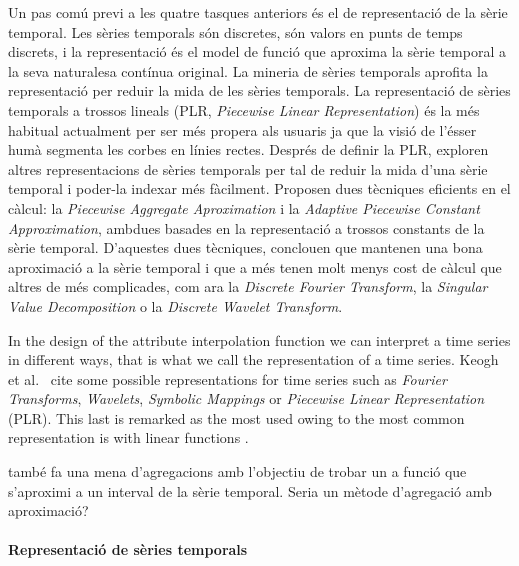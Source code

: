 Un pas comú previ a les quatre tasques anteriors és el de representació de la sèrie temporal. Les sèries temporals són discretes, són valors en punts de temps discrets, i la representació és el model de funció que aproxima la sèrie temporal a la seva naturalesa contínua original. La mineria de sèries temporals aprofita la representació per reduir la mida de les sèries temporals.
La representació de sèries temporals a trossos lineals (PLR, \emph{Piecewise Linear Representation}) \parencite{keogh97,keogh98} {é}s la més habitual actualment per ser més propera als usuaris ja que la visió de l'ésser humà segmenta les corbes en línies rectes.
Després de definir la PLR, \textcite{keogh00,keogh01} exploren altres representacions de sèries temporals per tal de reduir la mida d'una sèrie temporal i poder-la indexar més fàcilment. Proposen dues tècniques eficients en el càlcul: la \emph{Piecewise Aggregate Aproximation} i la \emph{Adaptive Piecewise Constant Approximation}, ambdues basades en la representació a trossos constants de la sèrie temporal. 
D'aquestes dues tècniques, \citeauthor{keogh00,keogh01} conclouen que mantenen una bona aproximació a la sèrie temporal i que a més  tenen molt menys cost de càlcul que altres de més complicades, com ara la \emph{Discrete Fourier Transform},  la  \emph{Singular Value Decomposition} o la \emph{Discrete Wavelet Transform}.




In the design of the attribute interpolation function we can interpret
a time series in different ways, that is what we call the
representation of a time series. Keogh et al.\ \cite{last:keogh} cite
some possible representations for time series such as \emph{Fourier
  Transforms}, \emph{Wavelets}, \emph{Symbolic Mappings} or
\emph{Piecewise Linear Representation} (PLR). This last is remarked as
the most used owing to the most common representation is with linear
functions \cite{keogh01}.


 també fa una mena d'agregacions amb l'objectiu de trobar un a funció que s'aproximi a un interval de la sèrie temporal. Seria un mètode d'agregació amb aproximació?


\paragraph{Representació de sèries temporals}

